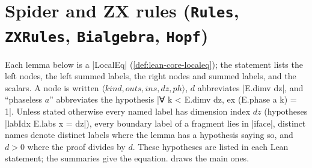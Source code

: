 \section{Spider and ZX rules (\texttt{Rules}, \texttt{ZXRules}, \texttt{Bialgebra}, \texttt{Hopf})}\label{sec:lean-core-zxrules}

Each lemma below is a \lean|LocalEq| (\cref{def:lean-core-localeq}); the statement lists the left
nodes, the left summed labels, the right nodes and summed labels, and the scalars. A node is written
$\langle\mathit{kind},\mathit{outs},\mathit{ins},\mathit{dz},\mathit{ph}\rangle$, $d$ abbreviates
\lean|E.dimv dz|, and ``phaseless $a$'' abbreviates the hypothesis
\lean|∀ k < E.dimv dz, ex (E.phase a k) = 1|. Unless stated otherwise every named label has
dimension index $dz$ (hypotheses \lean|labIdx E.labs x = dz|), every boundary label of a fragment
lies in \lean|iface|, distinct names denote distinct labels where the lemma has a hypothesis saying
so, and $d>0$ where the proof divides by $d$. These hypotheses are listed in each Lean statement;
the summaries give the equation.  draws the main ones.


